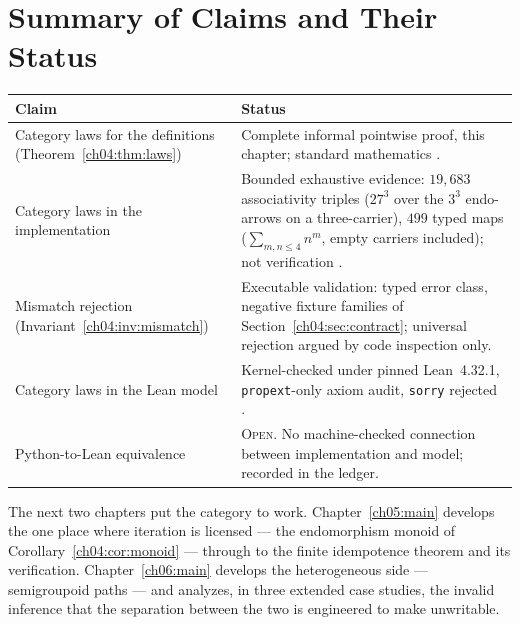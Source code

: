 \section{Summary of Claims and Their Status}
\label{ch04:sec:summary}

\begin{center}
\small
\begin{tabular}{@{}p{5.2cm}p{7.6cm}@{}}
\toprule
Claim & Status \\
\midrule
Category laws for the definitions (Theorem~\ref{ch04:thm:laws}) &
Complete informal pointwise proof, this chapter; standard mathematics
\cite{maclanecwm}. \\
Category laws in the implementation &
Bounded exhaustive evidence: $19{,}683$ associativity triples
($27^{3}$ over the $3^{3}$ endo-arrows on a three-carrier), $499$ typed maps
($\sum_{m,n \le 4} n^{m}$, empty carriers included); not verification
\cite{jackson}. \\
Mismatch rejection (Invariant~\ref{ch04:inv:mismatch}) &
Executable validation: typed error class, negative fixture families of
Section~\ref{ch04:sec:contract}; universal rejection argued by code
inspection only. \\
Category laws in the Lean model &
Kernel-checked under pinned Lean~4.32.1, \texttt{propext}-only axiom audit,
\texttt{sorry} rejected \cite{lean4}. \\
Python-to-Lean equivalence &
\textsc{Open}. No machine-checked connection between implementation and
model; recorded in the ledger. \\
\bottomrule
\end{tabular}
\end{center}

The next two chapters put the category to work. Chapter~\ref{ch05:main}
develops the one place where iteration is licensed --- the endomorphism
monoid of Corollary~\ref{ch04:cor:monoid} --- through to the finite
idempotence theorem and its verification. Chapter~\ref{ch06:main} develops
the heterogeneous side --- semigroupoid paths --- and analyzes, in three
extended case studies, the invalid inference that the separation between the
two is engineered to make unwritable.
